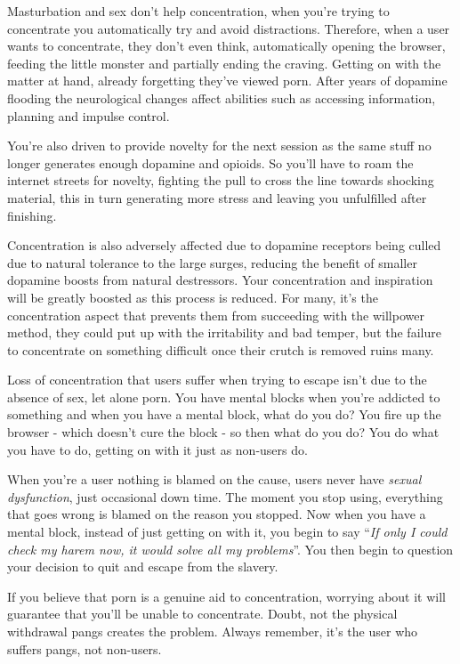 \documentclass[
]{book}
\begin{document}
Masturbation and sex don't help concentration, when you're trying to concentrate you automatically try and avoid distractions. Therefore, when a user wants to concentrate, they don't even think, automatically opening the browser, feeding the little monster and partially ending the craving. Getting on with the matter at hand, already forgetting they've viewed porn. After years of dopamine flooding the neurological changes affect abilities such as accessing information, planning and impulse control.

You're also driven to provide novelty for the next session as the same stuff no longer generates enough dopamine and opioids. So you'll have to roam the internet streets for novelty, fighting the pull to cross the line towards shocking material, this in turn generating more stress and leaving you unfulfilled after finishing.

Concentration is also adversely affected due to dopamine receptors being culled due to natural tolerance to the large surges, reducing the benefit of smaller dopamine boosts from natural destressors. Your concentration and inspiration will be greatly boosted as this process is reduced. For many, it's the concentration aspect that prevents them from succeeding with the willpower method, they could put up with the irritability and bad temper, but the failure to concentrate on something difficult once their crutch is removed ruins many.

Loss of concentration that users suffer when trying to escape isn't due to the absence of sex, let alone porn. You have mental blocks when you're addicted to something and when you have a mental block, what do you do? You fire up the browser - which doesn't cure the block - so then what do you do? You do what you have to do, getting on with it just as non-users do.

When you're a user nothing is blamed on the cause, users never have \emph{sexual dysfunction}, just occasional down time. The moment you stop using, everything that goes wrong is blamed on the reason you stopped. Now when you have a mental block, instead of just getting on with it, you begin to say ``\emph{If only I could check my harem now, it would solve all my problems}''. You then begin to question your decision to quit and escape from the slavery.

If you believe that porn is a genuine aid to concentration, worrying about it will guarantee that you'll be unable to concentrate. Doubt, not the physical withdrawal pangs creates the problem. Always remember, it's the user who suffers pangs, not non-users.
\end{document}
